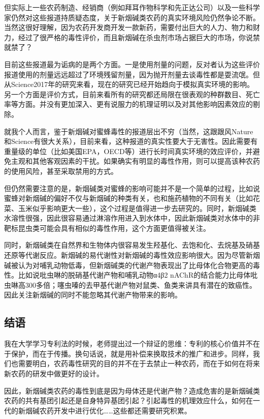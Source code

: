 \documentclass[
]{book}
\begin{document}
但实际上一些农药制造、经销商（例如拜耳作物科学和先正达公司）以及一些科学家仍然对这些报道持质疑态度，关于新烟碱类农药的真实环境风险仍然争论不断。当然这很好理解，因为农药开发商开发一款新药，需要付出巨大的人力、物力和财力，经过了很严格的毒性评价，而且新烟碱在杀虫剂市场占据巨大的市场，你说禁就禁了？

目前这些报道最为诟病的是两个方面。一是使用剂量的问题，反对者认为这些评价报道使用的剂量远远超过了环境残留剂量，因为抛开剂量去谈毒性都是耍流氓。但从Science2017年的研究来看，现在的研究已经开始趋向于模拟真实环境的影响。另一个方面是评价方式，目前来看所有的研究都还局限在很表观的种群数目、死亡率等方面。并没有更加深入、更有说服力的机理证明以及对其他影响因素效应的剔除。

就我个人而言，鉴于新烟碱对蜜蜂毒性的报道层出不穷（当然，这跟跟风Nature和Science有很大关系），目前来看，这种报道的真实性要大于无害性。因此需要有重量级的单位（比如美国EPA，OECD等）进行长时间真实环境的效应评价，并避免主观和其他客观因素的干扰。如果确实有明显的毒性作用，则可以提高该种农药的使用风险，甚至采取禁用的方式。

但仍然需要注意的是，新烟碱类对蜜蜂的影响可能并不是一个简单的过程，比如说蜜蜂对新烟碱的偏好不仅与新烟碱的种类有关，也和施药植物的不同有关（比如花菜、玉米似乎影响更大一些），这个过程是值得进一步去研究的。同时，新烟碱类水溶性很强，因此很容易通过淋溶作用进入到水体中，因此新烟碱类对水体中的非靶标昆虫类可能会具有相似的毒性作用，这个方面更值得被关注。

同时，新烟碱类在自然界和生物体内很容易发生羟基化、去饱和化、去烷基及硝基还原等代谢反应。新烟碱的易代谢性对新烟碱的毒性效应影响很大。因为尽管新烟碱被认为对哺乳动物低毒，但新烟碱类的代谢产物表现出了比母体化合物更高的毒性。比如说吡虫啉的脱硝基代谢产物和哺乳动物α4β2 nAChR的结合能力比母体吡虫啉高300多倍；噻虫嗪的去甲基代谢产物对鼠类、鱼类来讲具有潜在的致癌性。因此关注新烟碱的同时不能忽略其代谢产物带来的影响。

\hypertarget{ux7ed3ux8bed-5}{%
\subsection{结语}\label{ux7ed3ux8bed-5}}

我在大学学习专利法的时候，老师提出过一个辩证的思维：专利的核心价值并不在于保护，而在于传播。换句话说，就是用补偿来换取技术的推广和进步。同样，我们也需要明白，农药毒性研究的目的并不在于去禁止一种农药，而在于如何在将来新农药的研发中做更好的设计。

因此，新烟碱类农药的毒性到底是因为母体还是代谢产物？造成危害的是新烟碱类农药的共有基团引起还是自身特异基团引起？引起毒性的机理效应什么，如何在一代的新烟碱农药开发中进行优化\ldots\ldots 这些都还需要研究积累。
\end{document}
